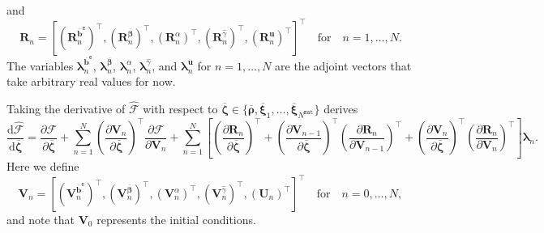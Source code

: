 \documentclass[preprint,11pt]{elsarticle}
\theoremstyle{definition}
\begin{document}
and
\begin{equation*}
    \mathbf{R}_n = \left[
    \left( \mathbf{R}_n^{\overline{\mathbf{b}}^\texttt{e}} \right)^\top,
    \left( \mathbf{R}_n^{\overline{\boldsymbol{\beta}}} \right)^\top,
    \left( \mathbf{R}_n^\alpha \right)^\top,
    \left( \mathbf{R}_n^{\widehat{\gamma}} \right)^\top,
    \left( \mathbf{R}_n^\mathbf{u} \right)^\top
    \right]^\top
    \quad \text{for} \quad
    n = 1,\ldots,N.
\end{equation*}
The variables $\boldsymbol{\lambda}_n^{\overline{\mathbf{b}}^\texttt{e}}$, $\boldsymbol{\lambda}_n^{\overline{\boldsymbol{\beta}}}$, $\boldsymbol{\lambda}_n^\alpha$, $\boldsymbol{\lambda}_n^{\widehat{\gamma}}$, and $\boldsymbol{\lambda}_n^\mathbf{u}$ for $n=1,\ldots,N$ are the adjoint vectors that take arbitrary real values for now.

Taking the derivative of $\widehat{\mathcal{F}}$ with respect to $\overline{\boldsymbol{\zeta}} \in \{ \overline{\boldsymbol{\rho}}, \overline{\boldsymbol{\xi}}_1, \ldots, \overline{\boldsymbol{\xi}}_{N^\texttt{mat}} \}$ derives
\begin{equation*}
    \dfrac{\text{d} \widehat{\mathcal{F}}}{\text{d} \overline{\boldsymbol{\zeta}}}
    = \dfrac{\partial \mathcal{F}}{\partial \overline{\boldsymbol{\zeta}}}
    + \sum_{n=1}^N \left( \dfrac{\partial \mathbf{V}_n}{\partial \overline{\boldsymbol{\zeta}}} \right)^\top \dfrac{\partial \mathcal{F}}{\partial \mathbf{V}_n}
    + \sum_{n=1}^N \left[ \left( \dfrac{\partial \mathbf{R}_n}{\partial \overline{\boldsymbol{\zeta}}} \right)^\top
    + \left( \dfrac{\partial \mathbf{V}_{n-1}}{\partial \overline{\boldsymbol{\zeta}}} \right)^\top \left( \dfrac{\partial \mathbf{R}_n}{\partial \mathbf{V}_{n-1}} \right)^\top
    + \left( \dfrac{\partial \mathbf{V}_n}{\partial \overline{\boldsymbol{\zeta}}} \right)^\top \left( \dfrac{\partial \mathbf{R}_n}{\partial \mathbf{V}_n} \right)^\top
    \right] \boldsymbol{\lambda}_n.
\end{equation*}
Here we define
\begin{equation*}
    \mathbf{V}_n = \left[
    \left( \mathbf{V}_n^{\overline{\mathbf{b}}^\texttt{e}} \right)^\top,
    \left( \mathbf{V}_n^{\overline{\boldsymbol{\beta}}} \right)^\top,
    \left( \mathbf{V}_n^\alpha \right)^\top,
    \left( \mathbf{V}_n^{\widehat{\gamma}} \right)^\top,
    \left( \mathbf{U}_n \right)^\top
    \right]^\top
    \quad \text{for} \quad
    n = 0,\ldots,N,
\end{equation*}
and note that $\mathbf{V}_0$ represents the initial conditions.
\end{document}
